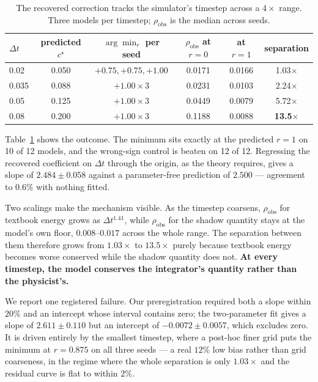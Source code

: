 \begin{table}[t]
\centering\small
\caption{The recovered correction tracks the simulator's timestep across a $4\times$ range. Three
models per timestep; $\rho_{\mathrm{obs}}$ is the median across seeds.}
\label{tab:timestep}
\begin{tabular}{lccccc}
\toprule
$\Delta t$ & predicted $c^\star$ & $\arg\min_r$ per seed & $\rho_{\mathrm{obs}}$ at $r{=}0$ & at $r{=}1$ & separation \\
\midrule
0.02  & 0.050 & $+0.75,+0.75,+1.00$ & 0.0171 & 0.0166 & 1.03$\times$ \\
0.035 & 0.088 & $+1.00\times3$ & 0.0231 & 0.0103 & 2.24$\times$ \\
0.05  & 0.125 & $+1.00\times3$ & 0.0449 & 0.0079 & 5.72$\times$ \\
0.08  & 0.200 & $+1.00\times3$ & 0.1188 & 0.0088 & \textbf{13.5}$\times$ \\
\bottomrule
\end{tabular}
\end{table}

Table~\ref{tab:timestep} shows the outcome. The minimum sits exactly at the predicted $r=1$ on 10 of
12 models, and the wrong-sign control is beaten on 12 of 12. Regressing the recovered coefficient on
$\Delta t$ through the origin, as the theory requires, gives a slope of $2.484 \pm 0.058$ against a
parameter-free prediction of $2.500$ --- agreement to $0.6\%$ with nothing fitted.

Two scalings make the mechanism visible. As the timestep coarsens, $\rho_{\mathrm{obs}}$ for textbook
energy grows as $\Delta t^{1.41}$, while $\rho_{\mathrm{obs}}$ for the shadow quantity stays at the
model's own floor, $0.008$--$0.017$ across the whole range. The separation between them therefore
grows from $1.03\times$ to $13.5\times$ purely because textbook energy becomes worse conserved while
the shadow quantity does not. \textbf{At every timestep, the model conserves the integrator's
quantity rather than the physicist's.}

We report one registered failure. Our preregistration required both a slope within $20\%$ and an
intercept whose interval contains zero; the two-parameter fit gives a slope of $2.611 \pm 0.110$ but
an intercept of $-0.0072 \pm 0.0057$, which excludes zero. It is driven entirely by the smallest
timestep, where a post-hoc finer grid puts the minimum at $r = 0.875$ on all three seeds --- a real
$12\%$ low bias rather than grid coarseness, in the regime where the whole separation is only
$1.03\times$ and the residual curve is flat to within $2\%$.

